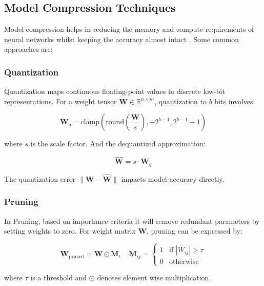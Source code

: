 \documentclass[conference]{IEEEtran}
\begin{document}
\subsection{Model Compression Techniques}

Model compression helps in reducing the memory and compute requirements of neural networks whilst keeping the accuracy almost intact \cite{cheng2017survey}. Some common approaches are:

\subsubsection{Quantization}

Quantization maps continuous floating-point values to discrete low-bit representations. For a weight tensor $\mathbf{W} \in \mathbb{R}^{n \times m}$, quantization to $b$ bits involves:

\begin{equation}
\mathbf{W}_q = \text{clamp}\left(\text{round}\left(\frac{\mathbf{W}}{s}\right), -2^{b-1}, 2^{b-1}-1\right)
\end{equation}

where $s$ is the scale factor. And the dequantized approximation:

\begin{equation}
\hat{\mathbf{W}} = s \cdot \mathbf{W}_q
\end{equation}

The quantization error $\|\mathbf{W} - \hat{\mathbf{W}}\|$ impacts model accuracy directly.

\subsubsection{Pruning}

In Pruning, based on importance criteria it will remove redundant parameters by setting weights to zero. For weight matrix $\mathbf{W}$, pruning can be expressed by:

\begin{equation}
\mathbf{W}_{\text{pruned}} = \mathbf{W} \odot \mathbf{M}, \quad \mathbf{M}_{ij} = \begin{cases} 1 & \text{if } |W_{ij}| > \tau \\ 0 & \text{otherwise} \end{cases}
\end{equation}

where $\tau$ is a threshold and $\odot$ denotes element wise multiplication.
\end{document}
